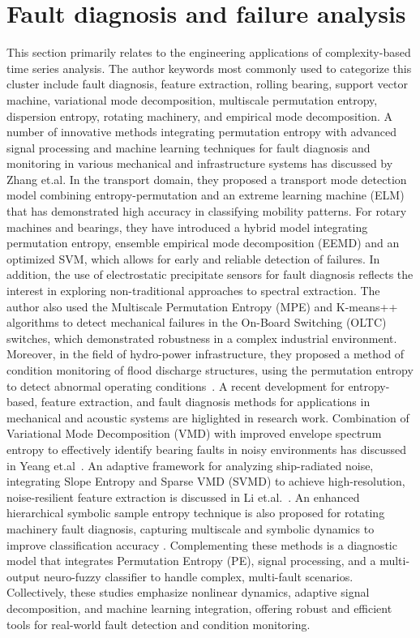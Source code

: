 \section{Fault diagnosis and failure analysis}\label{Sec:ReviewTopicFault}
This section primarily relates to the engineering applications of complexity-based time series analysis. The author keywords most commonly used to categorize this cluster include fault diagnosis, feature extraction, rolling bearing, support vector machine, variational mode decomposition, multiscale permutation entropy, dispersion entropy, rotating machinery, and empirical mode decomposition. 
A number of innovative methods integrating permutation entropy with advanced signal processing and machine learning techniques for fault diagnosis and monitoring in various mechanical and infrastructure systems has discussed by Zhang et.al. In the transport domain, they proposed a transport mode detection model combining entropy-permutation and an extreme learning machine (ELM) that has demonstrated high accuracy in classifying mobility patterns. For rotary machines and bearings, they have introduced a hybrid model integrating permutation entropy, ensemble empirical mode decomposition (EEMD) and an optimized SVM, which allows for early and reliable detection of failures. In addition, the use of electrostatic precipitate sensors for fault diagnosis reflects the interest in exploring non-traditional approaches to spectral extraction. The author also used the Multiscale Permutation Entropy (MPE) and K-means++ algorithms to detect mechanical failures in the On-Board Switching (OLTC) switches, which demonstrated robustness in a complex industrial environment. Moreover, in the field of hydro-power infrastructure, they proposed a method of condition monitoring of flood discharge structures, using the permutation entropy to detect abnormal operating conditions~\cite{Zhang2015, Zhang2015b, Zhang2015c, Zhang2018a, Zhang2018h}. A recent development for entropy-based, feature extraction, and fault diagnosis methods for applications in mechanical and acoustic systems are higlighted in research work. Combination of Variational Mode Decomposition (VMD) with improved envelope spectrum entropy to effectively identify bearing faults in noisy environments has discussed in Yeang et.al~\cite{Yang2023b}. An adaptive framework for analyzing ship-radiated noise, integrating Slope Entropy and Sparse VMD (SVMD) to achieve high-resolution, noise-resilient feature extraction is discussed in Li et.al.~\cite{Li2023h}. An enhanced hierarchical symbolic sample entropy technique is also proposed for rotating machinery fault diagnosis, capturing multiscale and symbolic dynamics to improve classification accuracy \cite{Wang2023h}. Complementing these methods is a diagnostic model that integrates Permutation Entropy (PE), signal processing, and a multi-output neuro-fuzzy classifier to handle complex, multi-fault scenarios. Collectively, these studies emphasize nonlinear dynamics, adaptive signal decomposition, and machine learning integration, offering robust and efficient tools for real-world fault detection and condition monitoring.~\cite{Rajabi2022} 

